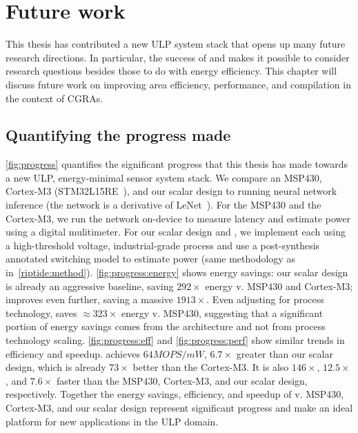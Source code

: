 \chapter{Future work}
\label{chapter:future}
This thesis has contributed a new ULP system stack that opens up many future research directions.
% 
In particular, the success of \snafu and \riptide makes it possible to consider research questions besides those to do with energy efficiency.
% 
This chapter will discuss future work on improving area efficiency, performance, and compilation in the context of CGRAs.

\section{Quantifying the progress made}
\figProgress
\autoref{fig:progress} quantifies the significant progress that this thesis has made towards a new ULP, energy-minimal sensor system stack.
%
We compare an MSP430, Cortex-M3 (STM32L15RE~\cite{stm32l1}), and our scalar design to \riptide running neural network inference (the network is a derivative of LeNet~\cite{lecun:ieee89:lenet}).
% 
For the MSP430 and the Cortex-M3, we run the network on-device to measure latency and estimate power using a digital mulitimeter. 
% 
For our scalar design and \riptide, we implement each using a high-threshold voltage, industrial-grade process and use a post-synthesis annotated switching model to estimate power (same methodology as in~\autoref{riptide:method}).
% 
\autoref{fig:progress:energy} shows energy savings: our scalar design is already an aggressive baseline, saving $292\times$ energy v. MSP430 and Cortex-M3; \riptide improves even further, saving a massive $1913\times$.
% 
Even adjusting for process technology, \riptide saves $\approx 323 \times$ energy v. MSP430, suggesting that a significant portion of energy savings comes from the architecture and not from process technology scaling.
% 
\autoref{fig:progress:eff} and \autoref{fig:progress:perf} show similar trends in efficiency and speedup.
% 
\riptide achieves $64MOPS/mW$, $6.7\times$ greater than our scalar design, which is already $73\times$ better than the Cortex-M3.
% 
It is also $146\times$, $12.5\times$, and $7.6\times$ faster than the MSP430, Cortex-M3, and our scalar design, respectively.
% 
Together the energy savings, efficiency, and speedup of \riptide v. MSP430, Cortex-M3, and our scalar design represent significant progress and make \riptide an ideal platform for new applications in the ULP domain.

